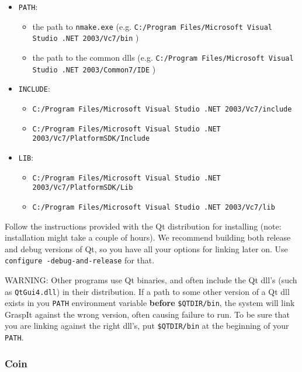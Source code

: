 \begin{itemize}

\item \texttt{PATH}:
\begin{itemize}
\item the path to \texttt{nmake.exe} (e.g. \texttt{C:/Program Files/Microsoft Visual Studio .NET 2003/Vc7/bin} )
\item the path to the common dlls (e.g. \texttt{C:/Program Files/Microsoft Visual Studio .NET 2003/Common7/IDE} )
\end{itemize}

\item \texttt{INCLUDE}:
\begin{itemize}
\item \texttt{C:/Program Files/Microsoft Visual Studio .NET 2003/Vc7/include}
\item \texttt{C:/Program Files/Microsoft Visual Studio .NET 2003/Vc7/PlatformSDK/Include}
\end{itemize}

\item \texttt{LIB}:
\begin{itemize}
\item \texttt{C:/Program Files/Microsoft Visual Studio .NET 2003/Vc7/PlatformSDK/Lib}
\item \texttt{C:/Program Files/Microsoft Visual Studio .NET 2003/Vc7/lib}
\end{itemize}

\end{itemize}

Follow the instructions provided with the Qt distribution for
installing (note: installation might take a couple of hours). We
recommend building both release and debug versions of Qt, so you have
all your options for linking later
on. Use \texttt{configure~-debug-and-release} for that.

WARNING: Other programs use Qt binaries, and often include the Qt
dll's (such as \texttt{QtGui4.dll}) in their distribution. If a path
to some other version of a Qt dll exists in you \texttt{PATH}
environment variable \textbf{before} \texttt{\$QTDIR/bin}, the system
will link GraspIt against the wrong version, often causing failure to
run. To be sure that you are linking against the right dll's, put
\texttt{\$QTDIR/bin} at the beginning of your \texttt{PATH}.

\subsubsection{Coin}

